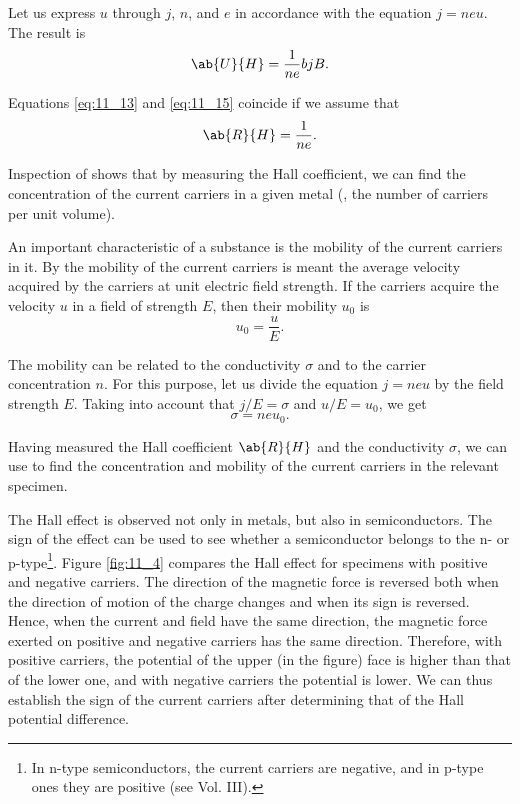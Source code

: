 \noindent
Let us express $u$ through $j$, $n$, and $e$ in accordance with the equation $j = neu$.
The result is
\begin{equation}\label{eq:11_15}
    \ab{U}{H} = \frac{1}{ne} b j B.
\end{equation}

\noindent
Equations \eqref{eq:11_13} and \eqref{eq:11_15} coincide if we assume that
\begin{equation}\label{eq:11_16}
    \ab{R}{H} = \frac{1}{ne}.
\end{equation}

Inspection of  shows that by measuring the Hall coefficient, we can find the concentration of the current carriers in a given metal (\ie, the number of carriers per unit volume).

An important characteristic of a substance is the mobility of the current carriers in it.
By the mobility of the current carriers is meant the average velocity acquired by the carriers at unit electric field strength.
If the carriers acquire the velocity $u$ in a field of strength $E$, then their mobility $u_0$ is
\begin{equation}\label{eq:11_17}
    u_0 = \frac{u}{E}.
\end{equation}

\noindent
The mobility can be related to the conductivity $\sigma$ and to the carrier concentration $n$.
For this purpose, let us divide the equation $j=neu$ by the field strength $E$.
Taking into account that $j/E=\sigma$ and $u/E=u_0$, we get
\begin{equation}\label{eq:11_18}
    \sigma = ne u_0.
\end{equation}

Having measured the Hall coefficient $\ab{R}{H}$ and the conductivity $\sigma$, we can use  to find the concentration and
mobility of the current carriers in the relevant specimen.

The Hall effect is observed not only in metals, but also in semiconductors.
The sign of the effect can be used to see whether a semiconductor belongs to the n- or p-type\footnote{In n-type semiconductors, the current carriers are negative, and in p-type ones they are positive (see Vol. III).}.
Figure \ref{fig:11_4} compares the Hall effect for specimens with positive and negative carriers.
The direction of the magnetic force is reversed both when the direction of motion of the charge changes and when its sign is reversed.
Hence, when the current and field have the same direction, the magnetic force exerted on positive and negative carriers has the same direction.
Therefore, with positive carriers, the potential of the upper (in the figure) face is higher than that of the lower one, and with negative carriers the potential is lower.
We can thus establish the sign of the current carriers after determining that of the Hall potential difference.

